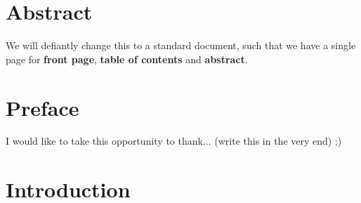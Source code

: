 \documentclass[
10pt, %
a4paper, %
oneside, %
headinclude,footinclude, %
] {book}%
\begin{document}

\chapter*{Abstract}
We will defiantly change this to a standard document, such that we have a single page for \textbf{front page}, 
\textbf{table of contents} and \textbf{abstract}.

\clearpage
\setcounter{tocdepth}{3} %
\tableofcontents %







\chapter*{Preface}

I would like to take this opportunity to thank... (write this in the very end) ;)



\chapter{Introduction}
\end{document}
